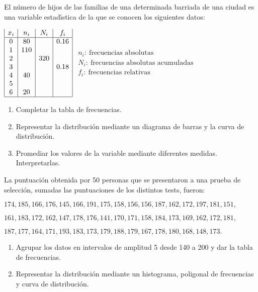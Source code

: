 \documentclass[hidequestions]{homework}
\begin{document}
	
	
	
	\problem
	\color{blue}
	El n{\'u}mero de hijos de las familias de una determinada
	barriada de una ciudad es una variable estad{\'\i}stica de la que se
	conocen los siguientes datos:
	
	\hskip 3cm $\begin{array}{|c|c|c|c|}
	x_{i} & n_{i} & N_{i} & f_{i}
	\\   \hline
	0 & 80  &     & 0\mbox{.}16 \\
	1 & 110 &     &      \\
	2 &     & 320 &      \\
	3 &     &     & 0\mbox{.}18 \\
	4 & 40  &     &      \\
	5 &     &     &      \\
	6 & 20  &     &  \\ \hline
	\end{array}$   \hskip 1.5cm $\begin{array}{l}  n_i: \ \mbox{frecuencias absolutas} \\ N_i:  \ \mbox{frecuencias absolutas acumuladas}\\ f_i:  \ \mbox{frecuencias relativas}\end{array}$
	\begin{enumerate}
		\item Completar la tabla de frecuencias.
		\item Representar la distribuci{\'o}n mediante un diagrama de
		barras y la curva de distribuci{\'o}n.
		\item Promediar los valores de la variable mediante diferentes
		medidas. Interpretarlas. \\
	\end{enumerate}
	
	\color{black}
	
	
	
	
	\problem
	\color{blue}
	La puntuaci{\'o}n obtenida por 50 personas que se presentaron a  una  prueba
	de selecci{\'o}n, sumadas las puntuaciones de los distintos tests, fueron:
	
	\smallskip
	\centerline{$174,185,166,176,145,166,191,175,158,156,156,187,162,172,197,181,151,$}
	\smallskip
	\centerline{$161,183,172,162,147,178,176,141,170,171,158,184,173,169,162,172,181,$}
	\smallskip
	\centerline{$187,177,164,171,193,183,173,179,188,179,167,178,180,168,148,173.$}
	\vskip -1cm
	\begin{enumerate}
		\item Agrupar los datos en intervalos de amplitud 5 desde 140 a 200 y dar la tabla de frecuencias.
		\item Representar la distribuci{\'o}n mediante un histograma, poligonal de
		frecuencias y curva de distribuci{\'o}n. \\
	\end{enumerate}
	
\end{document}
